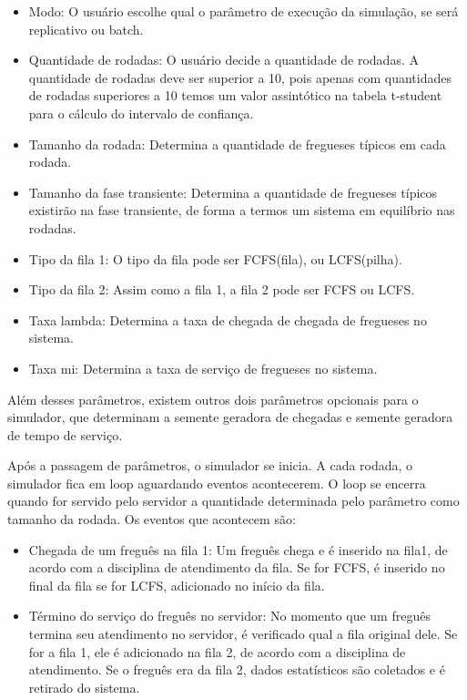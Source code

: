 \documentclass[a4paper,10pt]{article}
\begin{document}
\begin {itemize}
\item Modo: O usuário escolhe qual o parâmetro de execução da simulação, se será replicativo ou batch.

\item Quantidade de rodadas: O usuário decide a quantidade de rodadas. A quantidade de rodadas deve ser superior a 10, pois apenas com quantidades de rodadas
superiores a 10 temos um valor assintótico na tabela t-student para o cálculo do intervalo de confiança.

\item Tamanho da rodada: Determina a quantidade de fregueses típicos em cada rodada.

\item Tamanho da fase transiente: Determina a quantidade de fregueses típicos existirão na fase transiente, de forma a termos um sistema em equilíbrio nas rodadas.

\item Tipo da fila 1: O tipo da fila pode ser FCFS(fila), ou LCFS(pilha).

\item Tipo da fila 2: Assim como a fila 1, a fila 2 pode ser FCFS ou LCFS.

\item Taxa lambda: Determina a taxa de chegada de chegada de fregueses no sistema.

\item Taxa mi: Determina a taxa de serviço de fregueses no sistema.
\end {itemize}

    Além desses parâmetros, existem outros dois parâmetros opcionais para o simulador, que determinam a semente geradora de chegadas e semente geradora
de tempo de serviço.

    Após a passagem de parâmetros, o simulador se inicia. A cada rodada, o simulador fica em loop aguardando eventos acontecerem. O loop se encerra quando for servido pelo
servidor a quantidade determinada pelo parâmetro como tamanho da rodada. Os eventos que acontecem são:

\begin {itemize}
\item Chegada de um freguês na fila 1: Um freguês chega e é inserido na fila1, de acordo com a disciplina de atendimento da fila. Se for FCFS, é inserido no final da fila
se for LCFS, adicionado no início da fila.

\item Término do serviço do freguês no servidor: No momento que um freguês termina seu atendimento no servidor, é verificado qual a fila original dele. Se for a fila 1,
ele é adicionado na fila 2, de acordo com a disciplina de atendimento. Se o freguês era da fila 2, dados estatísticos são coletados e é retirado do sistema.
\end {itemize}
\end{document}
